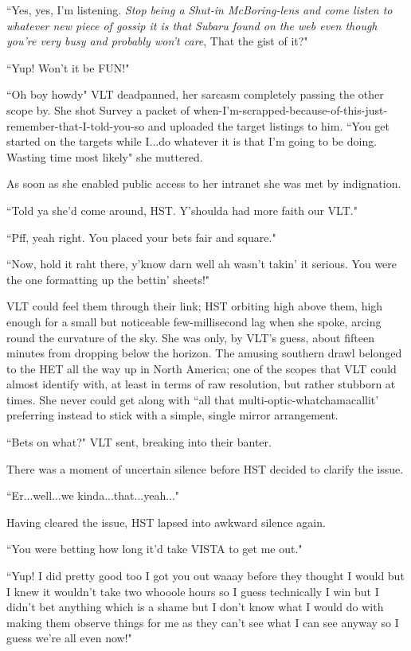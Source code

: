 \documentclass[12pt]{iopart}
\begin{document}
``Yes, yes, I'm listening. \emph{Stop being a Shut-in McBoring-lens and come listen to whatever new piece of gossip it is that Subaru found on the web even though you're very busy and probably won't care}, That the gist of it?"

``Yup! Won't it be FUN!"

``Oh boy howdy" VLT deadpanned, her sarcasm completely passing the other scope by. She shot Survey a packet of when-I'm-scrapped-because-of-this-just-remember-that-I-told-you-so and uploaded the target listings to him. ``You get started on the targets while I...do whatever it is that I'm going to be doing. Wasting time most likely" she muttered.

As soon as she enabled public access to her intranet she was met by indignation.

``Told ya she'd come around, HST. Y'shoulda had more faith our VLT."

``Pff, yeah right. You placed your bets fair and square."

``Now, hold it raht there, y'know darn well ah wasn't takin' it serious. You were the one formatting up the bettin' sheets!"

VLT could feel them through their link; HST orbiting high above them, high enough for a small but noticeable few-millisecond lag when she spoke, arcing round the curvature of the sky. She was only, by VLT's guess, about fifteen minutes from dropping below the horizon. The amusing southern drawl belonged to the HET all the way up in North America; one of the scopes that VLT could almost identify with, at least in terms of raw resolution, but rather stubborn at times. She never could get along with ``all that multi-optic-whatchamacallit' preferring instead to stick with a simple, single mirror arrangement.

``Bets on what?" VLT sent, breaking into their banter.

There was a moment of uncertain silence before HST decided to clarify the issue.

``Er...well...we kinda...that...yeah..."

Having cleared the issue, HST lapsed into awkward silence again.

``You were betting how long it'd take VISTA to get me out."

``Yup! I did pretty good too I got you out waaay before they thought I would but I knew it wouldn't take two whooole hours so I guess technically I win but I didn't bet anything which is a shame but I don't know what I would do with making them observe things for me as they can't see what I can see anyway so I guess we're all even now!"
\end{document}
